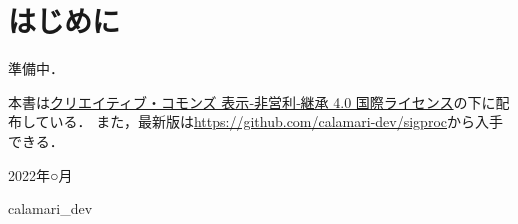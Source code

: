\documentclass[../../main]{subfiles}
\begin{document}
\chapter{はじめに}
\thispagestyle{empty}
準備中．

本書は\href{https://creativecommons.org/licenses/by-nc-sa/4.0/deed.ja}{クリエイティブ・コモンズ 表示‐非営利‐継承 4.0 国際ライセンス}の下に配布している．
また，最新版は\url{https://github.com/calamari-dev/sigproc}から入手できる．

\vspace{1\zh}
\begin{flushleft}
  \noindent\hspace{2\zw} 2022年○月
\end{flushleft}
\begin{flushright}
  calamari\_dev\hspace*{2\zw}
\end{flushright}
\end{document}
